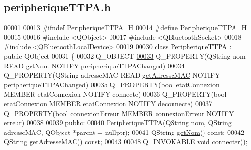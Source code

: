 \hypertarget{peripherique_t_t_p_a_8h_source}{}\subsection{peripherique\+T\+T\+P\+A.\+h}
\label{peripherique_t_t_p_a_8h_source}

\begin{DoxyCode}
00001 
00013 \textcolor{preprocessor}{#ifndef PeripheriqueTTPA\_H}
00014 \textcolor{preprocessor}{#define PeripheriqueTTPA\_H}
00015 
00016 \textcolor{preprocessor}{#include <QObject>}
00017 \textcolor{preprocessor}{#include <QBluetoothSocket>}
00018 \textcolor{preprocessor}{#include <QBluetoothLocalDevice>}
00019 
\hyperlink{class_peripherique_t_t_p_a}{00030} \textcolor{keyword}{class }\hyperlink{class_peripherique_t_t_p_a}{PeripheriqueTTPA} : \textcolor{keyword}{public} QObject
00031 \{
00032     Q\_OBJECT
\hyperlink{class_peripherique_t_t_p_a_afafe3566b4b5357819811218b9a4244f}{00033}     Q\_PROPERTY(QString nom READ \hyperlink{class_peripherique_t_t_p_a_abb04680791a7e778ac3808b5d218421f}{getNom} NOTIFY peripheriqueTTPAChanged)
\hyperlink{class_peripherique_t_t_p_a_a444063230c83cf81eff8a3a55736f2cf}{00034}     Q\_PROPERTY(QString adresseMAC READ \hyperlink{class_peripherique_t_t_p_a_a1e828514b4576a87295bb2d9a3d87876}{getAdresseMAC} NOTIFY peripheriqueTTPAChanged)
\hyperlink{class_peripherique_t_t_p_a_a3aaac9f045cc038777895afe18411e58}{00035}     Q\_PROPERTY(\textcolor{keywordtype}{bool} etatConnexion MEMBER etatConnexion NOTIFY connecte)
00036     Q\_PROPERTY(\textcolor{keywordtype}{bool} etatConnexion MEMBER etatConnexion NOTIFY deconnecte)
\hyperlink{class_peripherique_t_t_p_a_a9602c4662641984ea44bf6caaac6e94c}{00037}     Q\_PROPERTY(\textcolor{keywordtype}{bool} connexionErreur MEMBER connexionErreur NOTIFY erreur)
00038 
00039 public:
00040     \hyperlink{class_peripherique_t_t_p_a}{PeripheriqueTTPA}(QString nom, QString adresseMAC, QObject *parent = \textcolor{keywordtype}{nullptr});
00041     QString \hyperlink{class_peripherique_t_t_p_a_abb04680791a7e778ac3808b5d218421f}{getNom}() const;
00042     QString \hyperlink{class_peripherique_t_t_p_a_a1e828514b4576a87295bb2d9a3d87876}{getAdresseMAC}() const;
00043 
00048     Q\_INVOKABLE \textcolor{keywordtype}{void} connecter();

\end{DoxyCode}

